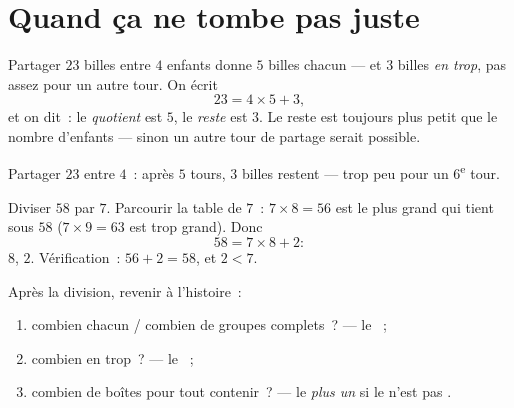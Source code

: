 \section{Quand ça ne tombe pas juste}

\begin{definition}[Reste]\label{def:g3:division:remainder}
Partager $23$ billes entre $4$ enfants donne $5$ billes chacun ---
et $3$ billes \emph{en trop}, pas assez pour un autre tour. On
écrit
\[
23 = 4 \times 5 + 3 ,
\]
et on dit~: le \emph{quotient} est $5$, le
\emph{reste} est $3$. Le reste est toujours plus petit
que le nombre d'enfants --- sinon un autre tour de partage serait
possible.
\end{definition}

\begin{omfigure}

{\small Partager $23$ entre $4$~: après $5$ tours, $3$ billes
restent --- trop peu pour un $6$\textsuperscript{e} tour.}
\end{omfigure}

\begin{example}\label{ex:g3:division:remainder}
Diviser $58$ par $7$. Parcourir la table de $7$~:
$7 \times 8 = 56$ est le plus grand  qui tient sous $58$
($7 \times 9 = 63$ est trop grand). Donc
\[
58 = 7 \times 8 + 2 :
\]
 $8$,  $2$. Vérification~: $56 + 2 = 58$, et
$2 < 7$.
\end{example}

\begin{method}\label{met:g3:division:interpret}
Après la division, revenir à l'histoire~:
\begin{enumerate}
  \item \guillemotleft{} combien chacun / combien de groupes
        complets~? \guillemotright{} --- le ~;
  \item \guillemotleft{} combien en trop~? \guillemotright{} --- le
        ~;
  \item \guillemotleft{} combien de boîtes pour tout contenir~?
        \guillemotright{} --- le  \emph{plus un} si le 
        n'est pas .
\end{enumerate}
\end{method}

